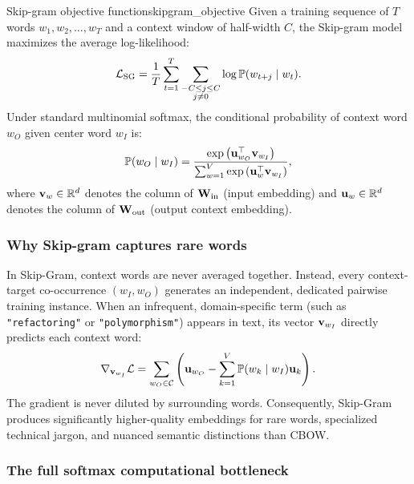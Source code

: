\documentclass[../../main.tex]{subfiles}
\begin{document}
\begin{definition}{Skip-gram objective function}{skipgram_objective}
Given a training sequence of $T$ words $w_1, w_2, \dots, w_T$ and a context window of half-width $C$, the Skip-gram model maximizes the average log-likelihood:
\begin{equation}
\label{eq:skipgram_loglik}
\mathcal{L}_{\text{SG}} = \frac{1}{T} \sum_{t=1}^T \sum_{\substack{-C \le j \le C \\ j \neq 0}} \log \mathbb{P}(w_{t+j} \mid w_t).
\end{equation}
Under standard multinomial softmax, the conditional probability of context word $w_O$ given center word $w_I$ is:
\begin{equation}
\label{eq:skipgram_softmax}
\mathbb{P}(w_O \mid w_I) = \frac{\exp\left( \mathbf{u}_{w_O}^\top \mathbf{v}_{w_I} \right)}{\sum_{w=1}^V \exp\left( \mathbf{u}_w^\top \mathbf{v}_{w_I} \right)},
\end{equation}
where $\mathbf{v}_w \in \mathbb{R}^d$ denotes the column of $\mathbf{W}_{\text{in}}$ (input embedding) and $\mathbf{u}_w \in \mathbb{R}^d$ denotes the column of $\mathbf{W}_{\text{out}}$ (output context embedding).
\end{definition}

\subsubsection{Why Skip-gram captures rare words}
\label{subsec:skipgram_rare_words}

In Skip-Gram, context words are never averaged together. Instead, every context-target co-occurrence $(w_I, w_O)$ generates an independent, dedicated pairwise training instance. When an infrequent, domain-specific term (such as \texttt{"refactoring"} or \texttt{"polymorphism"}) appears in text, its vector $\mathbf{v}_{w_I}$ directly predicts each context word:
\begin{equation}
\label{eq:skipgram_pair_grad}
\nabla_{\mathbf{v}_{w_I}} \mathcal{L} = \sum_{w_O \in \mathcal{C}} \left( \mathbf{u}_{w_O} - \sum_{k=1}^V \mathbb{P}(w_k \mid w_I) \mathbf{u}_k \right).
\end{equation}
The gradient is never diluted by surrounding words. Consequently, Skip-Gram produces significantly higher-quality embeddings for rare words, specialized technical jargon, and nuanced semantic distinctions than CBOW.

\subsubsection{The full softmax computational bottleneck}
\label{subsec:softmax_bottleneck}
\end{document}
